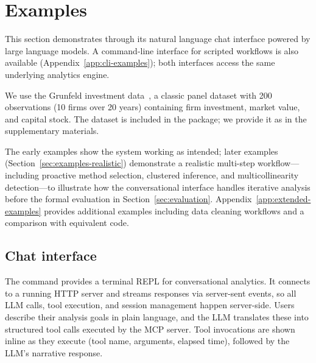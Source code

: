 
\section{Examples} \label{sec:examples}

This section demonstrates  through
its natural language chat interface powered by large language models.
A command-line interface for scripted workflows is also available
(Appendix~\ref{app:cli-examples}); both interfaces access the same
underlying  analytics engine.

We use the Grunfeld investment data~\citep{Baltagi:2013}, a classic
panel dataset with 200 observations (10 firms over 20 years) containing
firm investment, market value, and capital stock. The dataset is included
in the  package; we provide it as  in the
supplementary materials.

\noindent The early examples show the system working as intended; later
examples (Section~\ref{sec:examples-realistic}) demonstrate a realistic
multi-step workflow---including proactive method selection, clustered
inference, and multicollinearity detection---to illustrate how the
conversational interface handles iterative analysis before the formal
evaluation in Section~\ref{sec:evaluation}.
Appendix~\ref{app:extended-examples} provides additional examples
including data cleaning workflows and a comparison with equivalent
 code.

\subsection{Chat interface} \label{sec:examples-chat}

The  command provides a terminal REPL for conversational
analytics.  It connects to a running  HTTP server and streams
responses via server-sent events, so all LLM calls, tool execution, and
session management happen server-side.  Users describe their analysis goals
in plain language, and the LLM translates these into structured tool calls
executed by the MCP server.  Tool invocations are shown inline as they
execute (tool name, arguments, elapsed time), followed by the LLM's
narrative response.

